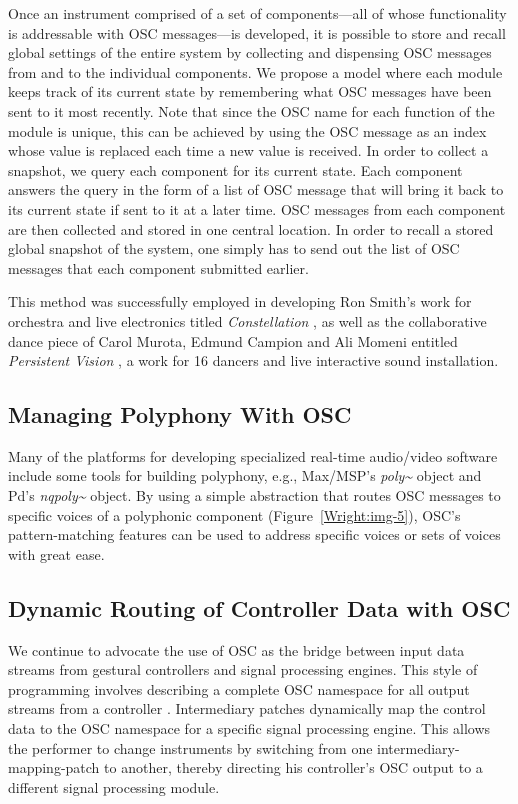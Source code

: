 Once an instrument comprised of a set
of components---all of whose functionality is addressable with OSC messages---is
developed, it is possible to store and recall global settings of the entire
system by collecting and dispensing OSC messages from and to the individual
components.  We propose a model where each module keeps track of its current
state by remembering what OSC messages have been sent to it most recently.  Note
that since the OSC name for each function of the module is unique, this can be
achieved by using the OSC message as an index whose value is replaced each time a
new value is received.  In order to collect a snapshot, we query each component
for its current state.  Each component answers the query in the form of a list of
OSC message that will bring it back to its current state if sent to it at a later
time.  OSC messages from each component are then collected and stored in one
central location.  In order to recall a stored global snapshot of the system, one
simply has to send out the list of OSC messages that each component submitted
earlier.

This method was successfully employed in developing Ron Smith's work for
orchestra and live electronics titled \textit{Constellation} \cite{Madden:2001}, as well as the
collaborative dance piece of Carol Murota, Edmund Campion and Ali Momeni entitled
\textit{Persistent Vision} \cite{Campion:2002}, a work for 16 dancers and live interactive sound
installation.

\subsection{Managing Polyphony With OSC}

Many of the platforms for developing specialized real-time audio/video software
include some tools for building polyphony, e.g., Max/MSP's
\textit{poly\textasciitilde{}} object and Pd's \textit{nqpoly\textasciitilde{}}
object.  By using a simple abstraction that routes OSC messages to specific
voices of a polyphonic component (Figure~\ref{Wright:img-5}), OSC's pattern-matching features can
be used to address specific voices or sets of voices with great ease.

\subsection{Dynamic Routing of Controller Data with OSC}

We continue to advocate the use of OSC as the bridge between input data streams
from gestural controllers and signal processing engines. This style of
programming involves describing a complete OSC namespace for all output streams
from a controller \cite{Wright:2001}.  Intermediary patches dynamically map the control data to
the OSC namespace for a specific signal processing engine.  This allows the
performer to change instruments by switching from one intermediary-mapping-patch
to another, thereby directing his controller's OSC output to a different signal
processing module.


